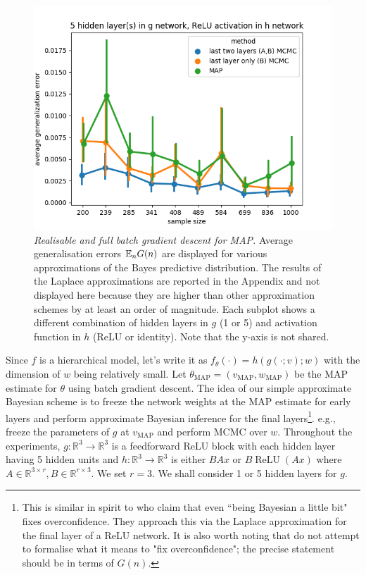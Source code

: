 \documentclass{article} %
\begin{document}
\begin{figure}[h!]
\begin{center}
		\includegraphics[scale=0.35]{taskid11.png}
	\end{center}
	\caption{\textit{Realisable and full batch gradient descent for MAP.} Average generalisation errors $\mathbb{E}_n G(n)$ are displayed for various approximations of the Bayes predictive distribution. The results of the Laplace approximations are reported in the Appendix and not displayed here because they are higher than other approximation schemes by at least an order of magnitude. Each subplot shows a different combination of hidden layers in $g$ (1 or 5) and activation function in $h$ (ReLU or identity). Note that the y-axis is not shared.
	}
	\label{fig:avg_gen_err_fullbatch_realisable}
\end{figure}




 Since $f$ is a hierarchical model, let's write it as $f_\theta(\cdot) = h(g(\cdot;v);w)$ with the dimension of $w$ being relatively small. Let $\theta_{\operatorname{MAP}} = (v_{\operatorname{MAP}}, w_{\operatorname{MAP}})$ be the MAP estimate for $\theta$ using batch gradient descent. The idea of our simple approximate Bayesian scheme is to freeze the network weights at the MAP estimate for early layers and perform approximate Bayesian inference for the final layers\footnote{This is similar in spirit to \citet{kristiadi_being_2020} who claim that even ``being Bayesian a little bit" fixes overconfidence. They approach this via the Laplace approximation for the final layer of a ReLU network. It is also worth noting that \citet{kristiadi_being_2020} do not attempt to formalise what it means to "fix overconfidence"; the precise statement should be in terms of $G(n)$.}. e.g., freeze the parameters of $g$ at $v_{\operatorname{MAP}}$ and perform MCMC over $w$. 
Throughout the experiments, $g: \mathbb R^3 \to \mathbb R^3$ is a feedforward ReLU block with each hidden layer having 5 hidden units and $h: \mathbb R^3 \to \mathbb R^3$ is either $BAx$ or $B \operatorname{ReLU}(Ax)$ where $A \in \mathbb R^{3 \times r}, B \in \mathbb R^{r \times 3}$. We set $r=3$. We shall consider 1 or 5 hidden layers for $g$. 
\end{document}
